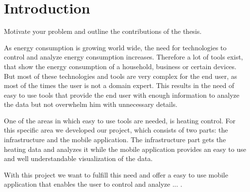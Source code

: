 
\chapter{Introduction}
\label{sec:introduction}

Motivate your problem and outline the contributions of the thesis.\cite{mattern2010ict}

As energy consumption is growing world wide, the need for technologies to control and analyze energy consumption increases.
Therefore a lot of tools exist, that show the energy consumption of a household, business or certain devices. 
But most of these technologies and tools are very complex for the end user, as most of the times the user is not a domain expert.
This results in the need of easy to use tools that provide the end user with enough information to analyze the data but not overwhelm him with unnecessary details.

One of the areas in which easy to use tools are needed, is heating control.
For this specific area we developed our project, which consists of two parts: the infrastructure and the mobile application.
The infrastructure part gets the heating data and analyzes it while the mobile application provides an easy to use and well understandable visualization of the data.

With this project we want to fulfill this need and offer a easy to use mobile application that enables the user to control and analyze ... .
